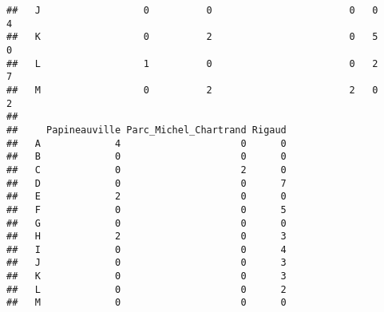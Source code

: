 \documentclass[
]{article}
\newenvironment{Shaded}{\begin{snugshade}}{\end{snugshade}}
\newcommand{\FunctionTok}[1]{\textcolor[rgb]{0.13,0.29,0.53}{\textbf{#1}}}
\newcommand{\NormalTok}[1]{#1}
\newcommand{\SpecialCharTok}[1]{\textcolor[rgb]{0.81,0.36,0.00}{\textbf{#1}}}
\begin{document}
\begin{verbatim}
##   J                  0          0                        0   0      4
##   K                  0          2                        0   5      0
##   L                  1          0                        0   2      7
##   M                  0          2                        2   0      2
##    
##     Papineauville Parc_Michel_Chartrand Rigaud
##   A             4                     0      0
##   B             0                     0      0
##   C             0                     2      0
##   D             0                     0      7
##   E             2                     0      0
##   F             0                     0      5
##   G             0                     0      0
##   H             2                     0      3
##   I             0                     0      4
##   J             0                     0      3
##   K             0                     0      3
##   L             0                     0      2
##   M             0                     0      0
\end{verbatim}

\begin{Shaded}
\end{Shaded}
\end{document}

